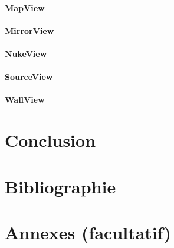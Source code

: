 \documentclass[]{article}
\begin{document}
\paragraph{MapView}

\paragraph{MirrorView}

\paragraph{NukeView}

\paragraph{SourceView}

\paragraph{WallView}

\section{Conclusion}

\section{Bibliographie}

\section{Annexes (facultatif)}
\end{document}
